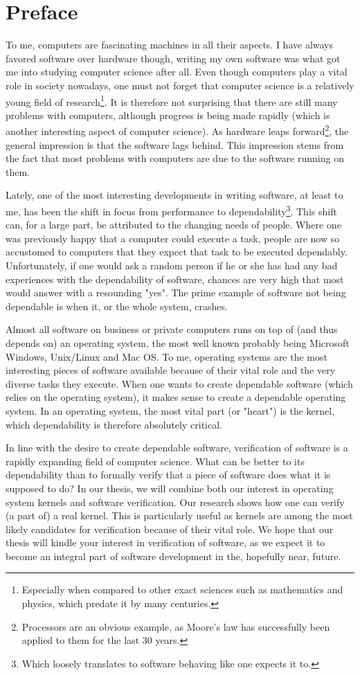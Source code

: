 \chapter*{Preface}
To me, computers are fascinating machines in all their aspects. I have always favored software over hardware though, writing my own software was what got me into studying computer science after all. Even though computers play a vital role in society nowadays, one must not forget that computer science is a relatively young field of research\footnote{Especially when compared to other exact sciences such as mathematics and physics, which predate it by many centuries.}. It is therefore not surprising that there are still many problems with computers, although progress is being made rapidly (which is another interesting aspect of computer science). As hardware leaps forward\footnote{Processors are an obvious example, as Moore's law has successfully been applied to them for the last 30 years.}, the general impression is that the software lags behind. This impression stems from the fact that most problems with computers are due to the software running on them.\emptyline

Lately, one of the most interesting developments in writing software, at least to me, has been the shift in focus from performance to dependability\footnote{Which loosely translates to software behaving like one expects it to.}. This shift can, for a large part, be attributed to the changing needs of people. Where one was previously happy that a computer could execute a task, people are now so accustomed to computers that they expect that task to be executed dependably. Unfortunately, if one would ask a random person if he or she has had any bad experiences with the dependability of software, chances are very high that most would answer with a resounding "yes". The prime example of software not being dependable is when it, or the whole system, crashes.\emptyline

Almost all software on business or private computers runs on top of (and thus depends on) an operating system, the most well known probably being Microsoft Windows, Unix/Linux and Mac OS. To me, operating systems are the most interesting pieces of software available because of their vital role and the very diverse tasks they execute. When one wants to create dependable software (which relies on the operating system), it makes sense to create a dependable operating system. In an operating system, the most vital part (or "heart") is the kernel, which dependability is therefore absolutely critical.\emptyline

In line with the desire to create dependable software, verification of software is a rapidly expanding field of computer science. What can be better to its dependability than to formally verify that a piece of software does what it is supposed to do? In our thesis, we will combine both our interest in operating system kernels and software verification. Our research shows how one can verify (a part of) a real kernel. This is particularly useful as kernels are among the most likely candidates for verification because of their vital role. We hope that our thesis will kindle your interest in verification of software, as we expect it to become an integral part of software development in the, hopefully near, future.